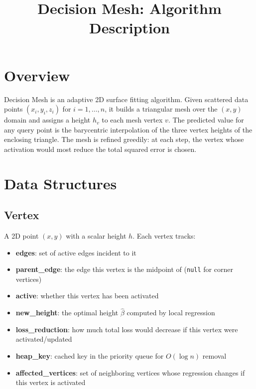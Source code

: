 \documentclass{article}
\title{Decision Mesh: Algorithm Description}
\author{}
\date{}
\begin{document}
\maketitle

\section{Overview}

Decision Mesh is an adaptive 2D surface fitting algorithm. Given scattered data points $(x_i, y_i, z_i)$ for $i = 1, \dots, n$, it builds a triangular mesh over the $(x, y)$ domain and assigns a height $h_v$ to each mesh vertex $v$. The predicted value for any query point is the barycentric interpolation of the three vertex heights of the enclosing triangle. The mesh is refined greedily: at each step, the vertex whose activation would most reduce the total squared error is chosen.

\section{Data Structures}

\subsection{Vertex}
A 2D point $(x, y)$ with a scalar height $h$. Each vertex tracks:
\begin{itemize}
    \item \textbf{edges}: set of active edges incident to it
    \item \textbf{parent\_edge}: the edge this vertex is the midpoint of (\texttt{null} for corner vertices)
    \item \textbf{active}: whether this vertex has been activated
    \item \textbf{new\_height}: the optimal height $\hat{\beta}$ computed by local regression
    \item \textbf{loss\_reduction}: how much total loss would decrease if this vertex were activated/updated
    \item \textbf{heap\_key}: cached key in the priority queue for $O(\log n)$ removal
    \item \textbf{affected\_vertices}: set of neighboring vertices whose regression changes if this vertex is activated
\end{itemize}
\end{document}
